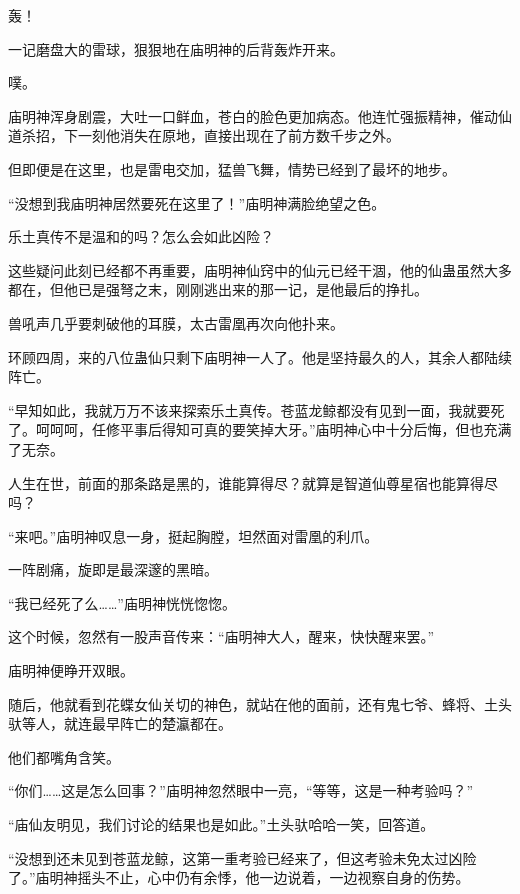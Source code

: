 
\begin{this_body}



轰！

一记磨盘大的雷球，狠狠地在庙明神的后背轰炸开来。

噗。

庙明神浑身剧震，大吐一口鲜血，苍白的脸色更加病态。他连忙强振精神，催动仙道杀招，下一刻他消失在原地，直接出现在了前方数千步之外。

但即便是在这里，也是雷电交加，猛兽飞舞，情势已经到了最坏的地步。

“没想到我庙明神居然要死在这里了！”庙明神满脸绝望之色。

乐土真传不是温和的吗？怎么会如此凶险？

这些疑问此刻已经都不再重要，庙明神仙窍中的仙元已经干涸，他的仙蛊虽然大多都在，但他已是强弩之末，刚刚逃出来的那一记，是他最后的挣扎。

兽吼声几乎要刺破他的耳膜，太古雷凰再次向他扑来。

环顾四周，来的八位蛊仙只剩下庙明神一人了。他是坚持最久的人，其余人都陆续阵亡。

“早知如此，我就万万不该来探索乐土真传。苍蓝龙鲸都没有见到一面，我就要死了。呵呵呵，任修平事后得知可真的要笑掉大牙。”庙明神心中十分后悔，但也充满了无奈。

人生在世，前面的那条路是黑的，谁能算得尽？就算是智道仙尊星宿也能算得尽吗？

“来吧。”庙明神叹息一身，挺起胸膛，坦然面对雷凰的利爪。

一阵剧痛，旋即是最深邃的黑暗。

“我已经死了么……”庙明神恍恍惚惚。

这个时候，忽然有一股声音传来：“庙明神大人，醒来，快快醒来罢。”

庙明神便睁开双眼。

随后，他就看到花蝶女仙关切的神色，就站在他的面前，还有鬼七爷、蜂将、土头驮等人，就连最早阵亡的楚瀛都在。

他们都嘴角含笑。

“你们……这是怎么回事？”庙明神忽然眼中一亮，“等等，这是一种考验吗？”

“庙仙友明见，我们讨论的结果也是如此。”土头驮哈哈一笑，回答道。

“没想到还未见到苍蓝龙鲸，这第一重考验已经来了，但这考验未免太过凶险了。”庙明神摇头不止，心中仍有余悸，他一边说着，一边视察自身的伤势。


\end{this_body}
